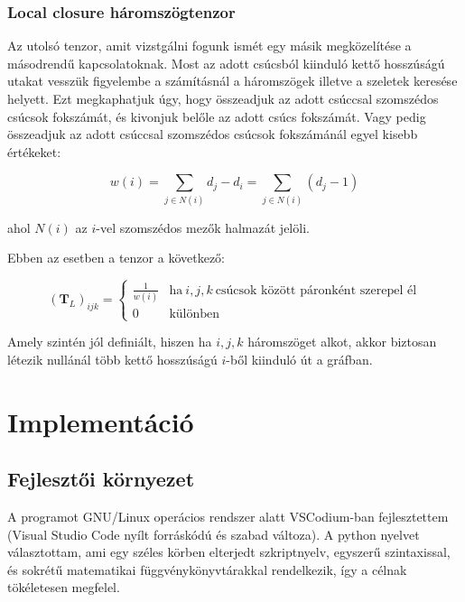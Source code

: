\documentclass[12pt,numbers=noenddot]{report}
\begin{document}
\pagebreak

\subsection*{Local closure háromszögtenzor}

Az utolsó tenzor, amit vizstgálni fogunk ismét egy másik megközelítése a 
másodrendű kapcsolatoknak.
Most az adott csúcsból kiinduló kettő hosszúságú utakat vesszük figyelembe a
számításnál a háromszögek illetve a szeletek keresése helyett.
Ezt megkaphatjuk úgy, hogy összeadjuk az adott csúccsal szomszédos csúcsok 
fokszámát, és kivonjuk belőle az adott csúcs fokszámát.
Vagy pedig összeadjuk az adott csúccsal szomszédos csúcsok fokszámánál egyel
kisebb értékeket:

$$w(i) = \sum_{j \in N(i)} d_j - d_i = \sum_{j \in N(i)} (d_j - 1)$$

ahol $N(i)$ az $i$-vel szomszédos mezők halmazát jelöli.

Ebben az esetben a tenzor a következő:

\begin{equation}
	(\boldsymbol{T}_L)_{ijk} = 
		\begin{cases}
			\frac{1}{w(i)} & \text{ha} ~ i, j, k ~ \text{csúcsok között páronként szerepel él} \\
			0 & \text{különben}
		\end{cases}
\end{equation}

Amely szintén jól definiált, hiszen ha $i, j, k$ háromszöget alkot, akkor 
biztosan létezik nullánál több kettő hosszúságú $i$-ből kiinduló út a gráfban.


\chapter{Implementáció}

\section{Fejlesztői környezet}

A programot GNU/Linux operácios rendszer alatt VSCodium-ban fejlesztettem 
(Visual Studio Code nyílt forráskódú és szabad változa). A python nyelvet 
választottam, ami egy széles körben elterjedt szkriptnyelv, egyszerű 
szintaxissal, és sokrétű matematikai függvénykönyvtárakkal rendelkezik,
így a célnak tökéletesen megfelel.
\end{document}

